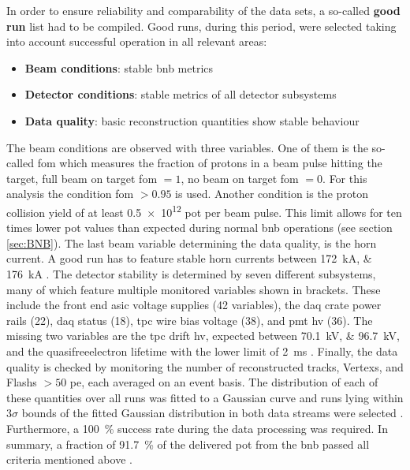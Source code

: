 In order to ensure reliability and comparability of the data sets, a so-called \textbf{good run} list had to be compiled. Good runs, during this period, were selected taking into account successful operation in all relevant areas: 
\begin{itemize}
    \item \textbf{Beam conditions}: stable \gls{bnb} metrics 
    \item \textbf{Detector conditions}: stable metrics of all detector subsystems
    \item \textbf{Data quality}: basic reconstruction quantities show stable behaviour
\end{itemize}
The beam conditions are observed with three variables. One of them is the so-called \gls{fom} which measures the fraction of protons in a beam pulse hitting the target, \ie full beam on target \gls{fom} $ = 1$, no beam on target \gls{fom} $ = 0$. For this analysis the condition \gls{fom} $ > 0.95$ is used. Another condition is the proton collision yield of at least \num{0.5e12} \gls{pot} per beam pulse. This limit allows for ten times lower \gls{pot} values than expected during normal \gls{bnb} operations (see section \ref{sec:BNB}). The last beam variable determining the data quality, is the horn current. A good run has to feature stable horn currents between \SIlist{172;176}{\kilo\ampere} \cite{MicroBooNEBeamStabilityIN}. The detector stability is determined by seven different subsystems, many of which feature multiple monitored variables shown in brackets. These include the front end \gls{asic} voltage supplies (\num{42} variables), the \gls{daq} crate power rails (\num{22}), \gls{daq} status (\num{18}), \gls{tpc} wire bias voltage (\num{38}), and \gls{pmt} \gls{hv} (36). The missing two variables are the \gls{tpc} drift \gls{hv}, expected between \SIlist{70.1;96.7}{\kilo\volt}, and the \gls{quasifreeelectron} lifetime with the lower limit of \SI{2}{\milli\second} \cite{MicroBooNEDetectorStabilityIN}. Finally, the data quality is checked by monitoring the number of reconstructed tracks, \glspl{Vertex}, and \glspl{Flash} $ > 50$ \gls{pe}, each averaged on an event basis. The distribution of each of these quantities over all runs was fitted to a Gaussian curve and runs lying within $3\sigma$ bounds of the fitted Gaussian distribution in both data streams were selected \cite{MicroBooNEDetectorStabilityPN}. Furthermore, a \SI{100}{\percent} success rate during the data processing was required. In summary, a fraction of \SI{91.7}{\percent} of the delivered \gls{pot} from the \gls{bnb} passed all criteria mentioned above \cite{MicroBooNECCInclPN}.

